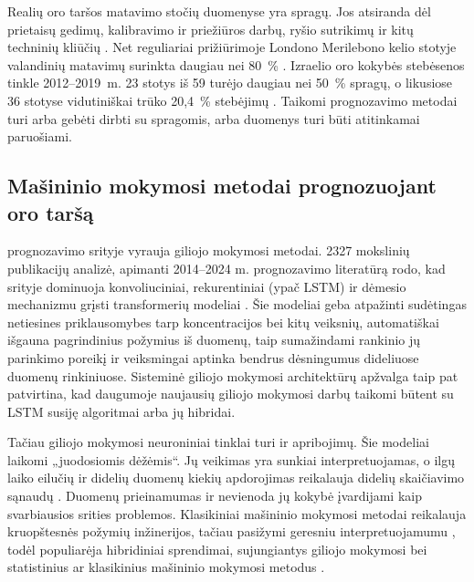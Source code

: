 \documentclass[]{VUMIFTemplateClass}
\begin{document}
    Realių oro taršos matavimo stočių duomenyse yra spragų.
    Jos atsiranda dėl prietaisų gedimų, kalibravimo ir priežiūros darbų, ryšio sutrikimų ir kitų techninių kliūčių \cite{belachsen2022}.
    Net reguliariai prižiūrimoje Londono Merilebono kelio stotyje valandinių matavimų surinkta daugiau nei 80~\% \cite{KAMARA2021118479}.
    Izraelio oro kokybės stebėsenos tinkle 2012--2019~m. 23 stotys iš 59 turėjo daugiau nei 50~\% spragų, o likusiose 36 stotyse vidutiniškai trūko 20,4~\%  stebėjimų \cite{belachsen2022}.
    Taikomi prognozavimo metodai turi arba gebėti dirbti su spragomis, arba duomenys turi būti atitinkamai paruošiami.


    \subsection{Mašininio mokymosi metodai prognozuojant oro taršą}

     prognozavimo srityje vyrauja giliojo mokymosi metodai.
    2327 mokslinių publikacijų analizė, apimanti 2014–2024 m.  prognozavimo literatūrą rodo, kad srityje dominuoja konvoliuciniai, rekurentiniai (ypač LSTM) ir dėmesio mechanizmu grįsti transformerių modeliai \cite{wu2025}.
    Šie modeliai geba atpažinti sudėtingas netiesines priklausomybes tarp  koncentracijos bei kitų veiksnių, automatiškai išgauna pagrindinius požymius iš duomenų, taip sumažindami rankinio jų parinkimo poreikį ir veiksmingai aptinka bendrus dėsningumus dideliuose duomenų rinkiniuose.
    Sisteminė giliojo mokymosi architektūrų apžvalga \cite{zhou2024} taip pat patvirtina, kad daugumoje naujausių giliojo mokymosi darbų taikomi būtent su LSTM susiję algoritmai arba jų hibridai.

    Tačiau giliojo mokymosi neuroniniai tinklai turi ir apribojimų.
    Šie modeliai laikomi „juodosiomis dėžėmis“.
    Jų veikimas yra sunkiai interpretuojamas, o ilgų laiko eilučių ir didelių duomenų kiekių apdorojimas reikalauja didelių skaičiavimo sąnaudų \cite{wu2025}.
    Duomenų prieinamumas ir nevienoda jų kokybė įvardijami kaip svarbiausios srities problemos.
    Klasikiniai mašininio mokymosi metodai reikalauja kruopštesnės požymių inžinerijos, tačiau pasižymi geresniu interpretuojamumu \cite{zhou2024}, todėl populiarėja hibridiniai sprendimai, sujungiantys giliojo mokymosi bei statistinius ar klasikinius mašininio mokymosi metodus \cite{wu2025}.
\end{document}
